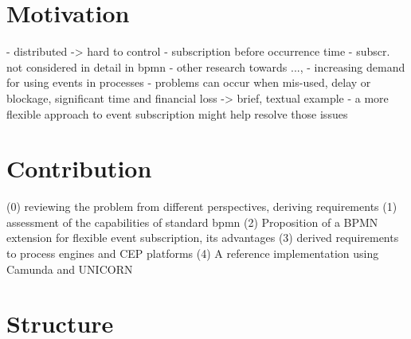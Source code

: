 \section{Motivation}
- distributed -> hard to control
- subscription before occurrence time
- subscr. not considered in detail in bpmn
- other research towards ..., 
- increasing demand for using events in processes
- problems can occur when mis-used, delay or blockage, significant time and financial loss
-> brief, textual example
- a more flexible approach to event subscription might help resolve those issues


\section{Contribution}
(0) reviewing the problem from different perspectives, deriving requirements
(1) assessment of the capabilities of standard bpmn
(2) Proposition of a BPMN extension for flexible event subscription, its advantages
(3) derived requirements to process engines and CEP platforms
(4) A reference implementation using Camunda and UNICORN


\section{Structure}
